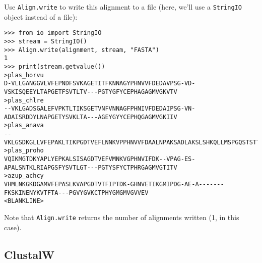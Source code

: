 Use \verb|Align.write| to write this alignment to a file (here, we'll use a \verb|StringIO| object instead of a file):
\begin{verbatim}
>>> from io import StringIO
>>> stream = StringIO()
>>> Align.write(alignment, stream, "FASTA")
1
>>> print(stream.getvalue())
>plas_horvu
D-VLLGANGGVLVFEPNDFSVKAGETITFKNNAGYPHNVVFDEDAVPSG-VD-VSKISQEEYLTAPGETFSVTLTV---PGTYGFYCEPHAGAGMVGKVTV
>plas_chlre
--VKLGADSGALEFVPKTLTIKSGETVNFVNNAGFPHNIVFDEDAIPSG-VN-ADAISRDDYLNAPGETYSVKLTA---AGEYGYYCEPHQGAGMVGKIIV
>plas_anava
--VKLGSDKGLLVFEPAKLTIKPGDTVEFLNNKVPPHNVVFDAALNPAKSADLAKSLSHKQLLMSPGQSTSTTFPADAPAGEYTFYCEPHRGAGMVGKITV
>plas_proho
VQIKMGTDKYAPLYEPKALSISAGDTVEFVMNKVGPHNVIFDK--VPAG-ES-APALSNTKLRIAPGSFYSVTLGT---PGTYSFYCTPHRGAGMVGTITV
>azup_achcy
VHMLNKGKDGAMVFEPASLKVAPGDTVTFIPTDK-GHNVETIKGMIPDG-AE-A-------FKSKINENYKVTFTA---PGVYGVKCTPHYGMGMVGVVEV
<BLANKLINE>
\end{verbatim}
Note that \verb|Align.write| returns the number of alignments written (1, in this case).

\subsection{ClustalW}
\label{subsec:align_clustal}

